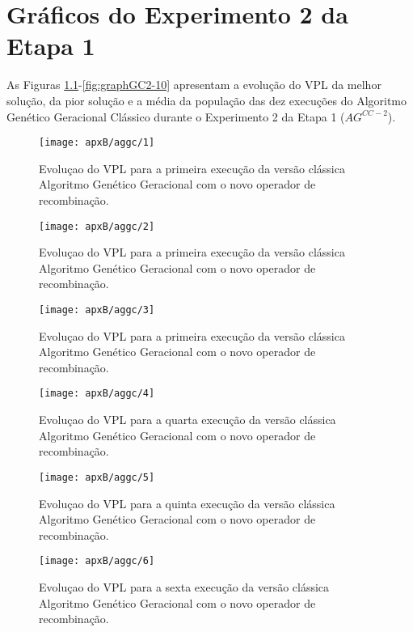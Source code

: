 \chapter{Gráficos do Experimento 2 da Etapa 1}
As Figuras \ref{fig:graphGC2-01}-\ref{fig:graphGC2-10} apresentam a evolução do VPL da melhor solução, da pior solução e a média da população das dez execuções do Algoritmo Genético Geracional Clássico durante o Experimento 2 da Etapa 1 ($AG^{CC-2}$).

\begin{figure}[H]
\centering
\texttt{[image: apxB/aggc/1]}
\caption{Evoluçao do VPL para a primeira execução da versão clássica Algoritmo Genético Geracional com o novo operador de recombinação.}
\label{fig:graphGC2-01}
\end{figure}

\begin{figure}[H]
\centering
\texttt{[image: apxB/aggc/2]}
\caption{Evoluçao do VPL para a primeira execução da versão clássica Algoritmo Genético Geracional com o novo operador de recombinação.}
\label{fig:graphGC2-02}
\end{figure}

\begin{figure}[H]
\centering
\texttt{[image: apxB/aggc/3]}
\caption{Evoluçao do VPL para a primeira execução da versão clássica Algoritmo Genético Geracional com o novo operador de recombinação.}
\label{fig:graphGC2-03}
\end{figure}

\begin{figure}[H]
\centering
\texttt{[image: apxB/aggc/4]}
\caption{Evoluçao do VPL para a quarta execução da versão clássica Algoritmo Genético Geracional com o novo operador de recombinação.}
\label{fig:graphGC2-04}
\end{figure}

\begin{figure}[H]
\centering
\texttt{[image: apxB/aggc/5]}
\caption{Evoluçao do VPL para a quinta execução da versão clássica Algoritmo Genético Geracional com o novo operador de recombinação.}
\label{fig:graphGC2-05}
\end{figure}

\begin{figure}[H]
\centering
\texttt{[image: apxB/aggc/6]}
\caption{Evoluçao do VPL para a sexta execução da versão clássica Algoritmo Genético Geracional com o novo operador de recombinação.}
\label{fig:graphGC2-06}
\end{figure}

